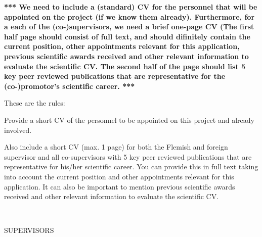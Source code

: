 \documentclass[11pt,dvipsnames,usenames,a4paper]{article}
\begin{document}
{\bf\color{blue}*** We need to include a (standard) CV for the personnel that will be appointed on the project (if we know them already). Furthermore, for a each of the (co-)supervisors, we need a brief one-page CV (The first half page should consist of full text, and should difinitely contain the current position, other appointments relevant for this application, previous scientific awards received and other relevant information to evaluate the scientific CV. The second half of the page should list 5 key peer reviewed publications that are representative for the (co-)promotor's scientific career. ***}

{\color{Gray}
These are the rules:

Provide a short CV of the personnel to be appointed on this project and already involved. 

Also include a short CV (max. 1 page) for both the Flemish and foreign supervisor and all co-supervisors with 5 key peer reviewed publications that are representative for his/her scientific career. You can provide this in full text taking into account the current position and other appointments relevant for this application. It can also be important to mention previous scientific awards received and other relevant information to evaluate the scientific CV.}\\

\begin{shaded}\centering SUPERVISORS \end{shaded}
\vspace{2pt}
\end{document}
